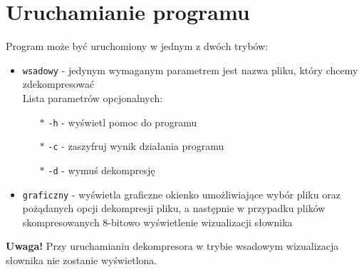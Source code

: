 \documentclass[]{article}
\begin{document}
\section{Uruchamianie programu}\label{header-n256}

Program może być uruchomiony w jednym z dwóch trybów:
\begin{itemize}
\item
    \texttt{wsadowy} - jedynym wymaganym parametrem jest nazwa pliku, który chcemy zdekompresować
    \\Lista parametrów opcjonalnych:

    \begin{itemize}
    \item[$\ast$]
     \texttt{-h} - wyświetl pomoc do programu
    \item[$\ast$]
     \texttt{-c} - zaszyfruj wynik działania programu
    \item[$\ast$]
     \texttt{-d} - wymuś dekompresję
    \end{itemize}
\item
    \texttt{graficzny} - wyświetla graficzne okienko umożliwiające wybór pliku oraz pożądanych opcji dekompresji pliku, a następnie w przypadku plików skompresowanych 8-bitowo wyświetlenie wizualizacji słownika
\end{itemize}

\textbf{Uwaga!} Przy uruchamianiu dekompresora w trybie wsadowym wizualizacja słownika nie zostanie wyświetlona.
\end{document}
